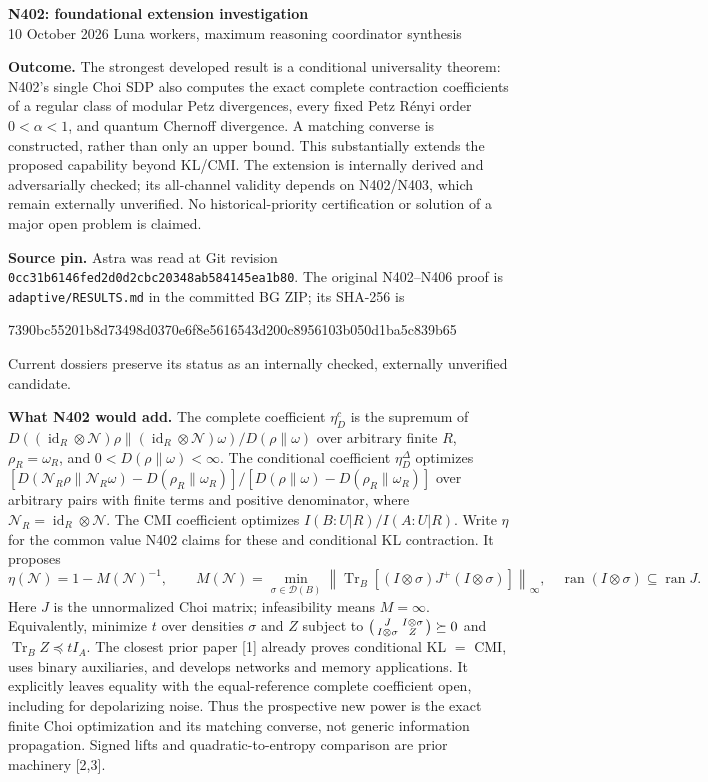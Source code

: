 \documentclass[10pt,a4paper]{article}
\newcommand{\Tr}{\operatorname{Tr}}
\newcommand{\id}{\operatorname{id}}
\newcommand{\ran}{\operatorname{ran}}
\newcommand{\D}{\mathcal D}
\newcommand{\N}{\mathcal N}
\begin{document}
\begin{center}
{\Large\bfseries N402: foundational extension investigation}\\[4pt]
{\small 10 October 2026  Luna workers, maximum reasoning \quad coordinator synthesis}
\end{center}

\textbf{Outcome.} The strongest developed result is a conditional universality theorem: N402's single Choi SDP also computes the exact complete contraction coefficients of a regular class of modular Petz divergences, every fixed Petz R\'enyi order $0<\alpha<1$, and quantum Chernoff divergence. A matching converse is constructed, rather than only an upper bound. This substantially extends the proposed capability beyond KL/CMI. The extension is internally derived and adversarially checked; its all-channel validity depends on N402/N403, which remain externally unverified. No historical-priority certification or solution of a major open problem is claimed.

\textbf{Source pin.} Astra was read at Git revision
\texttt{0cc31b6146fed2d0d2cbc20348ab584145ea1b80}.
The original N402--N406 proof is \texttt{adaptive/RESULTS.md} in the committed BG ZIP; its SHA-256 is
\par{\footnotesize\ttfamily 7390bc55201b8d73498d0370e6f8e5616543d200c8956103b050d1ba5c839b65}\par
Current dossiers preserve its status as an internally checked, externally unverified candidate.

\textbf{What N402 would add.} The complete coefficient $\eta_D^c$ is the supremum of $D((\id_R\otimes\N)\rho\|(\id_R\otimes\N)\omega)/D(\rho\|\omega)$ over arbitrary finite $R$, $\rho_R=\omega_R$, and $0<D(\rho\|\omega)<\infty$. The conditional coefficient $\eta_D^\Delta$ optimizes
$[D(\N_R\rho\|\N_R\omega)-D(\rho_R\|\omega_R)]/[D(\rho\|\omega)-D(\rho_R\|\omega_R)]$ over arbitrary pairs with finite terms and positive denominator, where $\N_R=\id_R\otimes\N$. The CMI coefficient optimizes $I(B:U|R)/I(A:U|R)$. Write $\eta$ for the common value N402 claims for these and conditional KL contraction. It proposes
\[
 \eta(\N)=1-M(\N)^{-1},\qquad
 M(\N)=\min_{\sigma\in\D(B)}
 \left\|\Tr_B[(I\otimes\sigma)J^+(I\otimes\sigma)]\right\|_\infty,
 \quad \ran(I\otimes\sigma)\subseteq\ran J.
\]
Here $J$ is the unnormalized Choi matrix; infeasibility means $M=\infty$.
Equivalently, minimize $t$ over densities $\sigma$ and $Z$ subject to
$\begin{psmallmatrix}J&I\otimes\sigma\\I\otimes\sigma&Z\end{psmallmatrix}\succeq0$ and $\Tr_B Z\preceq tI_A$.
The closest prior paper [1] already proves conditional KL $=$ CMI, uses binary auxiliaries, and develops networks and memory applications. It explicitly leaves equality with the equal-reference complete coefficient open, including for depolarizing noise. Thus the prospective new power is the exact finite Choi optimization and its matching converse, not generic information propagation. Signed lifts and quadratic-to-entropy comparison are prior machinery [2,3].
\end{document}
